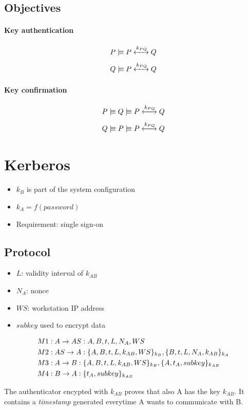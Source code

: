 \documentclass[a4paper,12pt]{article}
\newcommand{\believes}{\mid\!\equiv}
\newcommand{\sharekey}[1]{\xleftrightarrow{#1}}
\begin{document}
\subsection{Objectives}
\paragraph{Key authentication}
\[P \believes P \sharekey{k_{PQ}} Q\]
\[Q \believes P \sharekey{k_{PQ}} Q\]
\paragraph{Key confirmation}
\[P \believes Q \believes P \sharekey{k_{PQ}} Q\]
\[Q \believes P \believes P \sharekey{k_{PQ}} Q\]

\section{Kerberos}
\begin{itemize}
	\item $k_B$ is part of the system configuration
	\item $k_A = f(password)$
	\item Requirement: single sign-on 
\end{itemize}

\subsection{Protocol}
\begin{itemize}
	\item $L$: validity interval of $k_{AB}$
	\item $N_A$: nonce
	\item $WS$: workstation IP address
	\item $subkey$ used to encrypt data
\end{itemize}
\begin{align}
&M1: A \to AS: A,B,t,L,N_A,WS \notag \\
&M2: AS \to A: \{A,B,t,L,k_{AB},WS\}_{k_B}, \{B,t,L,N_A,k_{AB}\}_{k_A} \notag \\
&M3: A \to B: \{A,B,t,L,k_{AB},WS\}_{k_B}, \{A,t_A, subkey\}_{k_{AB}} \notag \\
&M4: B \to A: \{t_A, subkey\}_{k_{AB}} \notag
\end{align}

The authenticator encypted with $k_{AB}$ proves that also A has the key $k_{AB}$. It contains a \textit{timestamp} generated everytime A wants to communicate with B.
\end{document}
